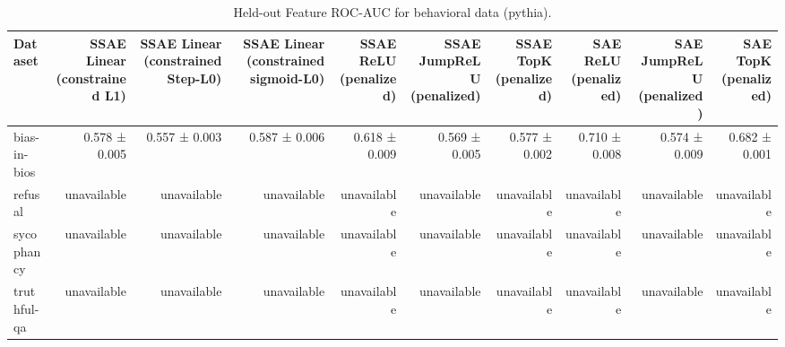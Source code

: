 \begin{table}[t]
\centering
\caption{Held-out Feature ROC-AUC for behavioral data (pythia).}
\label{tab:behavioral-pythia-sae-auc}
\begin{tabular}{lrrrrrrrrr}
\toprule
Dataset & SSAE Linear (constrained L1) & SSAE Linear (constrained Step-L0) & SSAE Linear (constrained sigmoid-L0) & SSAE ReLU (penalized) & SSAE JumpReLU (penalized) & SSAE TopK (penalized) & SAE ReLU (penalized) & SAE JumpReLU (penalized) & SAE TopK (penalized) \\
\midrule
bias-in-bios & 0.578 ± 0.005 & 0.557 ± 0.003 & 0.587 ± 0.006 & 0.618 ± 0.009 & 0.569 ± 0.005 & 0.577 ± 0.002 & 0.710 ± 0.008 & 0.574 ± 0.009 & 0.682 ± 0.001 \\
refusal & unavailable & unavailable & unavailable & unavailable & unavailable & unavailable & unavailable & unavailable & unavailable \\
sycophancy & unavailable & unavailable & unavailable & unavailable & unavailable & unavailable & unavailable & unavailable & unavailable \\
truthful-qa & unavailable & unavailable & unavailable & unavailable & unavailable & unavailable & unavailable & unavailable & unavailable \\
\bottomrule
\end{tabular}
\end{table}
